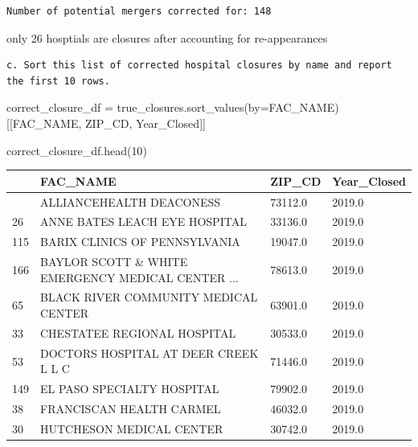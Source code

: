 \documentclass[
  letterpaper,
  DIV=11,
  numbers=noendperiod]{scrartcl}
\newenvironment{Shaded}{\begin{snugshade}}{\end{snugshade}}
\newcommand{\DecValTok}[1]{\textcolor[rgb]{0.68,0.00,0.00}{#1}}
\newcommand{\NormalTok}[1]{\textcolor[rgb]{0.00,0.23,0.31}{#1}}
\newcommand{\OperatorTok}[1]{\textcolor[rgb]{0.37,0.37,0.37}{#1}}
\newcommand{\StringTok}[1]{\textcolor[rgb]{0.13,0.47,0.30}{#1}}
\begin{document}
\begin{verbatim}
Number of potential mergers corrected for: 148
\end{verbatim}

only 26 hosptials are closures after accounting for re-appearances

\begin{verbatim}
c. Sort this list of corrected hospital closures by name and report the first 10 rows.
\end{verbatim}

\begin{Shaded}
\begin{Highlighting}[]
\NormalTok{correct\_closure\_df }\OperatorTok{=}\NormalTok{ true\_closures.sort\_values(by}\OperatorTok{=}\StringTok{\textquotesingle{}FAC\_NAME\textquotesingle{}}\NormalTok{)[[}\StringTok{\textquotesingle{}FAC\_NAME\textquotesingle{}}\NormalTok{, }\StringTok{\textquotesingle{}ZIP\_CD\textquotesingle{}}\NormalTok{, }\StringTok{\textquotesingle{}Year\_Closed\textquotesingle{}}\NormalTok{]]}

\NormalTok{correct\_closure\_df.head(}\DecValTok{10}\NormalTok{)}
\end{Highlighting}
\end{Shaded}

\begin{longtable}[]{@{}llll@{}}
\toprule\noalign{}
& FAC\_NAME & ZIP\_CD & Year\_Closed \\
\midrule\noalign{}
\endhead
\bottomrule\noalign{}
\endlastfoot
101 & ALLIANCEHEALTH DEACONESS & 73112.0 & 2019.0 \\
26 & ANNE BATES LEACH EYE HOSPITAL & 33136.0 & 2019.0 \\
115 & BARIX CLINICS OF PENNSYLVANIA & 19047.0 & 2019.0 \\
166 & BAYLOR SCOTT \& WHITE EMERGENCY MEDICAL CENTER ... & 78613.0 &
2019.0 \\
65 & BLACK RIVER COMMUNITY MEDICAL CENTER & 63901.0 & 2019.0 \\
33 & CHESTATEE REGIONAL HOSPITAL & 30533.0 & 2019.0 \\
53 & DOCTORS HOSPITAL AT DEER CREEK L L C & 71446.0 & 2019.0 \\
149 & EL PASO SPECIALTY HOSPITAL & 79902.0 & 2019.0 \\
38 & FRANCISCAN HEALTH CARMEL & 46032.0 & 2019.0 \\
30 & HUTCHESON MEDICAL CENTER & 30742.0 & 2019.0 \\
\end{longtable}
\end{document}
